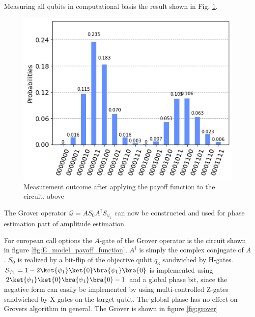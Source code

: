 \documentclass[../main.tex]{subfiles}
\begin{document}
Measuring all qubits in computational basis the result shown in Fig. \ref{fig:E_probability_estimate}.
 \begin{figure}[H]
  \begin{center}
    \includegraphics[width=0.5\linewidth]{../../images/probability_estimate.png}
  \end{center}
  \caption{Measurement outcome after applying the payoff function to the circuit. above}
  \label{fig:E_probability_estimate}
\end{figure}

The Grover operator $\mathcal{Q}=AS_0A^\dagger S_{\psi_1}$ can now be constructed and used for phase estimation part of amplitude estimation. 

For european call options the $A$-gate of the Grover operator is the circuit shown in figure \ref{fig:E_model_payoff_function}, $A^{\dagger}$ is simply the complex conjugate of $A$. 
$S_0$ is realized by a bit-flip of the objective qubit $q_3$ sandwiched by H-gates. $S_{\psi_1} = 1-2\ket{\psi_1}\ket{0}\bra{\psi_1}\bra{0}$ is implemented using $2\ket{\psi_1}\ket{0}\bra{\psi_1}\bra{0}-1$
and a global phase bit, since the negative form can easily be implemented by using multi-controlled Z-gates sandwiched by X-gates on the target qubit. 
The global phase has no effect on Grovers algorithm in general. The Grover is shown in figure \ref{fig:grover}
\end{document}

